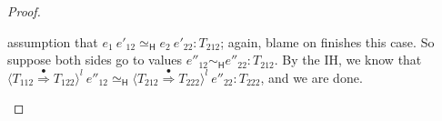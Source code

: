 \documentclass[9pt]{extarticle}
\newcommand{\ottnt}[1]{\mathit{#1}}
\begin{document}
{\begin{lemma}
\begin{proof}
{\begin{itemize}
\begin{itemize}
        assumption that $  \ottnt{e_{{\mathrm{1}}}} ~ \ottnt{e'_{{\mathrm{12}}}}    \simeq _{  \mathsf{H}  }   \ottnt{e_{{\mathrm{2}}}} ~ \ottnt{e'_{{\mathrm{22}}}}   :  \ottnt{T_{{\mathrm{212}}}} $; again, blame
        on finishes this case. So suppose both sides go to values
        $ \ottnt{e''_{{\mathrm{12}}}}   \sim _{  \mathsf{H}  }  \ottnt{e''_{{\mathrm{22}}}}  :  \ottnt{T_{{\mathrm{212}}}} $. By the IH, we know that
        $  \langle  \ottnt{T_{{\mathrm{112}}}}  \mathord{ \overset{\bullet}{\Rightarrow} }  \ottnt{T_{{\mathrm{122}}}}  \rangle^{ \ottnt{l} } ~  \ottnt{e''_{{\mathrm{12}}}}    \simeq _{  \mathsf{H}  }   \langle  \ottnt{T_{{\mathrm{212}}}}  \mathord{ \overset{\bullet}{\Rightarrow} }  \ottnt{T_{{\mathrm{222}}}}  \rangle^{ \ottnt{l} } ~  \ottnt{e''_{{\mathrm{22}}}}   :  \ottnt{T_{{\mathrm{222}}}} $, and
        we are done.


\end{itemize}
\end{itemize}}
\end{proof}
\end{lemma}}
\end{document}
